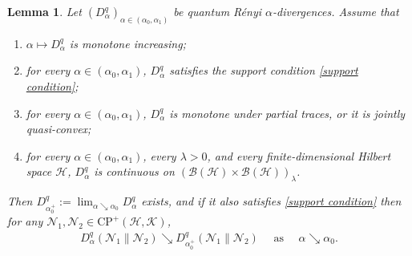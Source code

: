 \documentclass[unsortedaddress,superscriptaddress,pra,notitlepage]{revtex4}
\newtheorem{lemma}[definition]{Lemma}
\def\B{{\mathcal B}}
\def\N{\mathcal{N}}
\def\hil{{\mathcal H}}
\def\kil{{\mathcal K}}
\def\CP{\mathrm{CP}}
\newcommand{\ds}{\mbox{ }\mbox{ }}
\begin{document}
\begin{lemma}\label{lemma:chdiv rightcont}
Let $(D_{\alpha}^q)_{\alpha\in(\alpha_0,\alpha_1)}$ be quantum R\'enyi $\alpha$-divergences.
Assume that 
\begin{enumerate}
\item\label{chdiv upper limit1}
$\alpha\mapsto D_{\alpha}^q$ is monotone increasing;
\item\label{chdiv upper limit2}
for every $\alpha\in(\alpha_0,\alpha_1)$, $D_{\alpha}^q$ satisfies the support condition 
\eqref{support condition};
\item\label{chdiv upper limit3}
for every $\alpha\in(\alpha_0,\alpha_1)$, $D_{\alpha}^q$ is monotone under partial traces, 
or it is jointly quasi-convex;
\item\label{chdiv upper limit4}
for every $\alpha\in(\alpha_0,\alpha_1)$, every $\lambda>0$, and every finite-dimensional 
Hilbert space $\hil$, $D_{\alpha}^q$ is continuous on 
$(\B(\hil)\times\B(\hil))_{\lambda}$. 
\end{enumerate}
Then $D_{\alpha_0^+}^q:=\lim_{\alpha\searrow \alpha_0}D_{\alpha}^q$ exists, and 
if it also satisfies \eqref{support condition} then 
for any $\N_1,\N_2\in\CP^+(\hil,\kil)$,
\begin{align*}
D_{\alpha}^q(\N_1\|\N_2)\searrow D_{\alpha_0^+}^q(\N_1\|\N_2)\ds\text{as}\ds
\alpha\searrow \alpha_0.
\end{align*}
\end{lemma}
\end{document}
